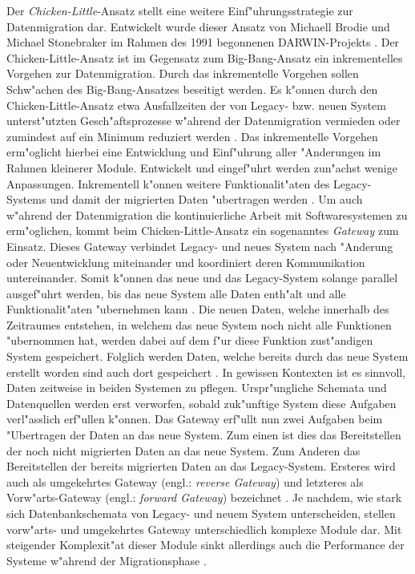 Der \textit{Chicken-Little}-Ansatz stellt eine weitere Einf"uhrungsstrategie zur Datenmigration dar. Entwickelt wurde dieser Ansatz von Michaell Brodie und Michael Stonebraker im Rahmen des 1991 begonnenen DARWIN-Projekts \citep{zoulafy-2002}. Der Chicken-Little-Ansatz ist im Gegensatz zum Big-Bang-Ansatz ein inkrementelles Vorgehen zur Datenmigration. Durch das inkrementelle Vorgehen sollen Schw"achen des Big-Bang-Ansatzes beseitigt werden. Es k"onnen durch den Chicken-Little-Ansatz etwa Ausfallzeiten der von Legacy- bzw. neuen System unterst"utzten Gesch"aftsprozesse w"ahrend der Datenmigration vermieden oder zumindest auf ein Minimum reduziert werden \citep{zoulafy-2002}.
\lb
Das inkrementelle Vorgehen erm"oglicht hierbei eine Entwicklung und Einf"uhrung aller "Anderungen im Rahmen kleinerer Module. Entwickelt und eingef"uhrt werden zun"achst wenige Anpassungen. Inkrementell k"onnen weitere Funktionalit"aten des Legacy-Systems und damit der migrierten Daten "ubertragen werden \citep[S.~2]{wuLawless-1997}.
\lb
Um auch w"ahrend der Datenmigration die kontinuierliche Arbeit mit Softwaresystemen zu erm"oglichen, kommt beim Chicken-Little-Ansatz ein sogenanntes \textit{Gateway} zum Einsatz. Dieses Gateway verbindet Legacy- und neues System nach "Anderung oder Neuentwicklung miteinander und koordiniert deren Kommunikation untereinander. Somit k"onnen das neue und das Legacy-System solange parallel ausgef"uhrt werden, bis das neue System alle Daten enth"alt und alle Funktionalit"aten "ubernehmen kann \citep[S.~2]{wuLawless-1997}. Die neuen Daten, welche innerhalb des Zeitraumes entstehen, in welchem das neue System noch nicht alle Funktionen "ubernommen hat, werden dabei auf dem f"ur diese Funktion zust"andigen System gespeichert. Folglich werden Daten, welche bereits durch das neue System erstellt worden sind auch dort gespeichert \citep[S.~2]{wuLawless-1997}. In gewissen Kontexten ist es sinnvoll, Daten zeitweise in beiden Systemen zu pflegen. Urspr"ungliche Schemata und Datenquellen werden erst verworfen, sobald zuk"unftige System diese Aufgaben verl"asslich erf"ullen k"onnen.
\lb
Das Gateway erf"ullt nun zwei Aufgaben beim "Ubertragen der Daten an das neue System. Zum einen ist dies das Bereitstellen der noch nicht migrierten Daten an das neue System. Zum Anderen das Bereitstellen der bereits migrierten Daten an das Legacy-System. Ersteres wird auch als umgekehrtes Gateway (engl.: \textit{reverse Gateway}) und letzteres als Vorw"arts-Gateway (engl.: \textit{forward Gateway}) bezeichnet \citep[S.~2]{wuLawless-1997}. Je nachdem, wie stark sich Datenbankschemata von Legacy- und neuem System unterscheiden, stellen vorw"arts- und umgekehrtes Gateway unterschiedlich komplexe Module dar. Mit steigender Komplexit"at dieser Module sinkt allerdings auch die Performance der Systeme w"ahrend der Migrationsphase \citep[S.~109]{bisbal-1999}.

